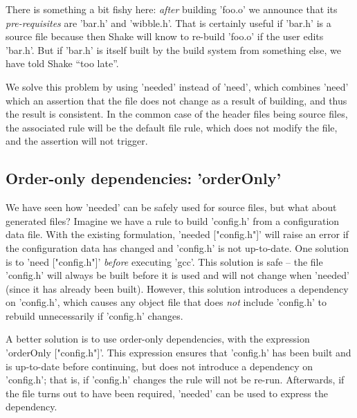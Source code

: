 There is something a bit fishy here: \emph{after} building \lst'foo.o' we
announce that its \emph{pre-requisites} are \lst'bar.h' and \lst'wibble.h'.
That is certainly useful if \lst'bar.h' is a source file because
then Shake will know to re-build \lst'foo.o' if the user edits \lst'bar.h'.
But if \lst'bar.h' is itself built by the build system from something else,
we have told Shake ``too late''.


We solve this problem by using \lst'needed' instead of \lst'need', which
combines \lst'need' which an assertion that the file does not change as a result
of building, and thus the result is consistent. In the common case of the header
files being source files, the associated rule will be the default file rule,
which does not modify the file, and the assertion will not trigger.

\subsection{Order-only dependencies: \lst'orderOnly'}

We have seen how \lst'needed' can be safely used for source files, but what
about generated files? Imagine we have a rule to build \lst'config.h' from a
configuration data file. With the existing formulation,
\lst'needed ["config.h"]' will raise an error if the configuration data has
changed and \lst'config.h' is not up-to-date. One solution is to \lst'need ["config.h"]'
\emph{before} executing \lst'gcc'. This solution is safe -- the file
\lst'config.h' will always be built before it is used and will not change when
\lst'needed' (since it has already been built). However, this solution
introduces a dependency on \lst'config.h', which causes any object file that
does \emph{not} include \lst'config.h' to rebuild unnecessarily if
\lst'config.h' changes.

A better solution is to use order-only dependencies, with the expression
\lst'orderOnly ["config.h"]'. This expression ensures that \lst'config.h' has
been built and is up-to-date before continuing, but does not introduce a
dependency on \lst'config.h'; that is, if \lst'config.h' changes
the rule will not be re-run. Afterwards, if the file turns out to have been
required, \lst'needed' can be used to express the dependency.

